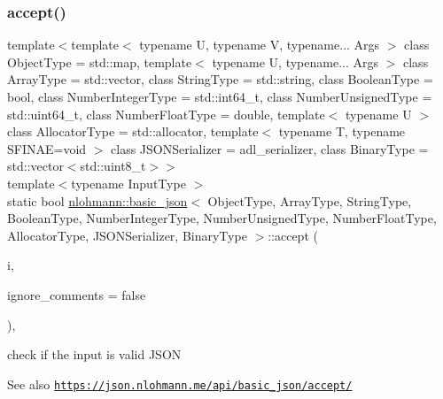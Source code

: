 \subsubsection{\texorpdfstring{accept()}{accept()}\hspace{0.1cm}{\footnotesize\ttfamily [1/2]}}
{\footnotesize\ttfamily template$<$template$<$ typename U, typename V, typename... Args $>$ class Object\+Type = std\+::map, template$<$ typename U, typename... Args $>$ class Array\+Type = std\+::vector, class String\+Type  = std\+::string, class Boolean\+Type  = bool, class Number\+Integer\+Type  = std\+::int64\+\_\+t, class Number\+Unsigned\+Type  = std\+::uint64\+\_\+t, class Number\+Float\+Type  = double, template$<$ typename U $>$ class Allocator\+Type = std\+::allocator, template$<$ typename T, typename S\+F\+I\+N\+A\+E=void $>$ class J\+S\+O\+N\+Serializer = adl\+\_\+serializer, class Binary\+Type  = std\+::vector$<$std\+::uint8\+\_\+t$>$$>$ \\
template$<$typename Input\+Type $>$ \\
static bool \hyperlink{classnlohmann_1_1basic__json}{nlohmann\+::basic\+\_\+json}$<$ Object\+Type, Array\+Type, String\+Type, Boolean\+Type, Number\+Integer\+Type, Number\+Unsigned\+Type, Number\+Float\+Type, Allocator\+Type, J\+S\+O\+N\+Serializer, Binary\+Type $>$\+::accept (\begin{DoxyParamCaption}\item[{Input\+Type \&\&}]{i,  }\item[{const bool}]{ignore\+\_\+comments = {\ttfamily false} }\end{DoxyParamCaption})\hspace{0.3cm}{\ttfamily [inline]}, {\ttfamily [static]}}



check if the input is valid J\+S\+ON 

\begin{DoxySeeAlso}{See also}
\href{https://json.nlohmann.me/api/basic_json/accept/}{\tt https\+://json.\+nlohmann.\+me/api/basic\+\_\+json/accept/} 
\end{DoxySeeAlso}
\mbox{\label{classnlohmann_1_1basic__json_a47fb596473649332185aedb0a8a6ccc5}} 
